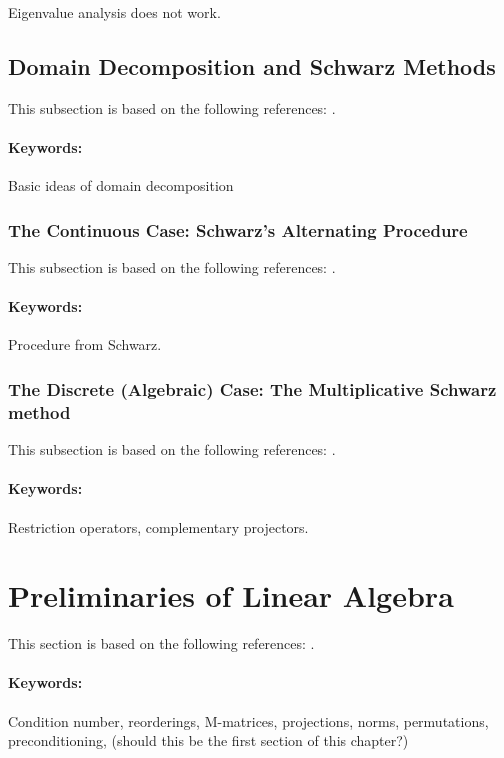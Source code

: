 Eigenvalue analysis does not work.


\subsection{Domain Decomposition and Schwarz Methods}
\label{back:itersolvers:DDM}
This subsection is based on the following references: \cite{ChaMat94, DolJolNat15, Gan08, TosWid05}.
\paragraph{Keywords:} Basic ideas of domain decomposition


\subsubsection{The Continuous Case: Schwarz's Alternating Procedure}
\label{back:itersolvers:DDM:AltSchwarz}
This subsection is based on the following references: \cite{Gan08, MacOriShi00, MacOriShi02, Sch69}.
\paragraph{Keywords:} Procedure from Schwarz.


\subsubsection{The Discrete (Algebraic) Case: The Multiplicative Schwarz method}
\label{back:itersolvers:DDM:MultSchwarz}
This subsection is based on the following references: \cite{BenFroNabSzy01}.
\paragraph{Keywords:} Restriction operators, complementary projectors.


\section{Preliminaries of Linear Algebra}
This section is based on the following references: \cite{Gal13, GolVan13, HorJoh12, Saa03}.
\paragraph{Keywords:} Condition number, reorderings, M-matrices, projections, norms, permutations, preconditioning, (should this be the first section of this chapter?)

\else

